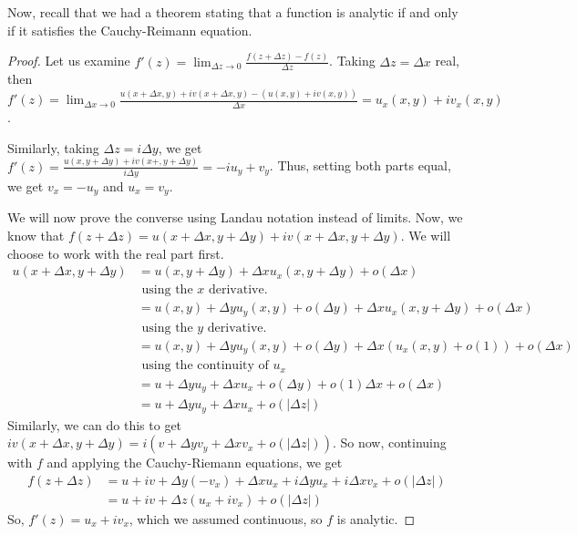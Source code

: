 \documentclass[11pt,leqno,oneside]{amsart}
\begin{document}
    Now, recall that we had a theorem stating that a function is analytic if
    and only if it satisfies the Cauchy-Reimann equation.
    \begin{proof}
        Let us examine $f'(z) = \lim_{\Delta z \to 0} \frac{f(z+\Delta z) -
        f(z)}{\Delta z}$. Taking $\Delta z = \Delta x$ real, then $f'(z) =
        \lim_{\Delta x \to 0} \frac{u(x+\Delta x, y)+iv(x+\Delta x,y) -
        (u(x,y)+iv(x,y))}{\Delta x} = u_x(x,y)+iv_x(x,y)$.

        Similarly, taking $\Delta z = i \Delta y$, we get $f'(z) = \frac{u(x,
        y+ \Delta y) + iv(x+,y+\Delta y)}{i\Delta y} = -iu_y+v_y$. Thus,
        setting both parts equal, we get $v_x = -u_y$ and $u_x = v_y$.

        We will now prove the converse using Landau notation instead of limits.
        Now, we know that $f(z+\Delta z) =
        u(x + \Delta x, y + \Delta y) + iv(x+\Delta x, y + \Delta y)$. We will
        choose to work with the real part first.
        \begin{align*}
            u(x+\Delta x, y + \Delta y)  & = u(x, y+ \Delta y) + \Delta x
            u_x(x,y+\Delta y) + o(\Delta x) \\
            \ & \text{ using the }x\text{ derivative.} \\
            \ & = u(x,y) + \Delta y u_y(x,y) + o(\Delta y) + \Delta x
            u_x(x,y+\Delta y) + o(\Delta x) \\
            \ & \text{ using the }y\text{ derivative.} \\
            \ & = u(x,y) + \Delta y u_y(x,y) + o(\Delta y) + \Delta x
            (u_x(x,y)+o(1)) + o(\Delta x) \\
            \ & \text{ using the continuity of }u_x\\
            \ & = u + \Delta y u_y + \Delta x u_x + o(\Delta y) + o(1)\Delta x
            + o(\Delta x) \\
            \ & = u + \Delta y u_y + \Delta x u_x + o(|\Delta z|)
        \end{align*}
        Similarly, we can do this to get $iv(x+\Delta x, y + \Delta y) =
        i(v+\Delta y v_y + \Delta x v_x + o(|\Delta z|))$. So now, continuing
        with $f$ and applying the Cauchy-Riemann equations, we get
        \begin{align*}
            f(z+\Delta z) & = u + iv + \Delta y (-v_x) + \Delta x u_x + i\Delta
            y u_x + i \Delta x v_x + o(|\Delta z|) \\
            \ & = u + iv + \Delta z(u_x+iv_x)+o(|\Delta z|)
        \end{align*}
        So, $f'(z) = u_x+iv_x$, which we assumed continuous, so $f$ is analytic.
    \end{proof}
\end{document}
